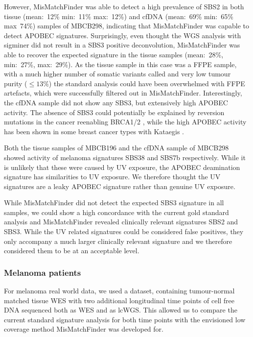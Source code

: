 However, MisMatchFinder was able to detect a high prevalence of SBS2 in both tissue (mean:~12\% min:~11\% max:~12\%) and cfDNA (mean:~69\% min:~65\% max~74\%) samples of MBCB298, indicating that MisMatchFinder was capable to detect APOBEC signatures. Surprisingly, even thought the WGS analysis with sigminer did not result in a SBS3 positive deconvolution, MisMatchFinder was able to recover the expected signature in the tissue samples (mean:~28\%, min:~27\%, max:~29\%). As the tissue sample in this case was a FFPE sample, with a much higher number of somatic variants called and very low tumour purity ($\leq 13\%$) the standard analysis could have been overwhelmed with FFPE artefacts, which were successfully filtered out in MisMatchFinder. Interestingly, the cfDNA sample did not show any SBS3, but extensively high APOBEC activity. The absence of SBS3 could potentially be explained by reversion mutations in the cancer reenabling BRCA1/2 \cite{Lin2018a}, while the high APOBEC activity has been shown in some breast cancer types with Kataegis \cite{Alexandrov2020,Rebhandl2015}.

Both the tissue samples of MBCB196 and the cfDNA sample of MBCB298 showed activity of melanoma signatures SBS38 and SBS7b respectively. While it is unlikely that these were caused by UV exposure, the APOBEC deamination signature has similarities to UV exposure. We therefore thought the UV signatures are a leaky APOBEC signature rather than genuine UV exposure.

While MisMatchFinder did not detect the expected SBS3 signature in all samples, we could show a high concordance with the current gold standard analysis and MisMatchFinder revealed clinically relevant signatures SBS2 and SBS3. While the UV related signatures could be considered false positives, they only accompany a much larger clinically relevant signature and we therefore considered them to be at an acceptable level.

\subsubsection{Melanoma patients}
\label{mmf-sec:melpatients}

For melanoma real world data, we used a dataset, containing tumour-normal matched tissue WES with two additional longitudinal time points of cell free DNA sequenced both as WES and as lcWGS. This allowed us to compare the current standard signature analysis for both time points with the envisioned low coverage method MisMatchFinder was developed for.


